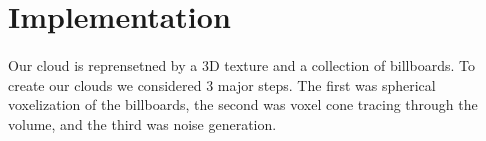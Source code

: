 

\newpage
\section{Implementation}\paragraph{}
Our cloud is reprensetned by a 3D texture and a collection of billboards. To create our clouds we considered 3 major steps. The first was spherical voxelization of the billboards, the second was voxel cone tracing through the volume, and the third was noise generation.




